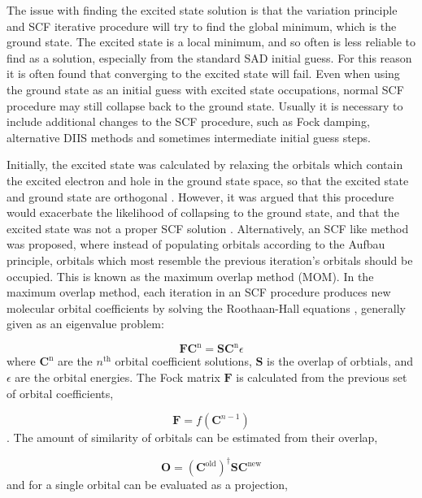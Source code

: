 The issue with finding the excited state solution is that the variation principle
and SCF iterative procedure will try to find the global minimum, which is the 
ground state. The excited state is a local minimum, and so often is less reliable
to find as a solution, especially from the standard SAD initial guess.
For this reason it is often found that converging to the \dscf excited state will
fail. Even when using the ground state as an initial guess with excited state
occupations, normal SCF procedure may still collapse back to the ground state.
Usually it is necessary to include additional changes to the SCF procedure,
such as Fock damping, alternative DIIS methods and sometimes intermediate 
initial guess steps.

Initially, the excited state was calculated by relaxing the orbitals which
contain the excited electron and hole in the ground state space, so that the
excited state and ground state are orthogonal \cite{Hunt1969}. However, it was
argued that this procedure would exacerbate the likelihood of collapsing to the ground
state, and that the excited state was not a proper SCF solution \cite{Gilbert2008}.
Alternatively, an SCF like method was proposed, where instead of
populating orbitals according to the Aufbau principle, orbitals which most
resemble the previous iteration's orbitals should be occupied. This is known as 
the maximum overlap method (MOM). In the maximum overlap method, each iteration 
in an SCF procedure produces new molecular orbital coefficients by solving the 
Roothaan-Hall equations \cite{Roothaan1951}, generally given as an eigenvalue problem:

\begin{equation}
\mathbf{F} \mathbf{C}^{\text{n}} = \mathbf{S} \mathbf{C}^{\text{n}} \epsilon
\label{eq:roothaan_hall}
\end{equation}
%
where $\mathbf{C}^{\text{n}}$ are the $n^{\text{th}}$ orbital coefficient solutions, 
$\mathbf{S}$ is the overlap of orbtials, and $\epsilon$ are the orbital energies. 
The Fock matrix $\mathbf{F}$ is calculated from the previous set of orbital 
coefficients,

\begin{equation}
\mathbf{F} = f\left(\mathbf{C}^{n-1}\right)
\end{equation}
%
. The amount of similarity of orbitals can be estimated from their overlap,

\begin{equation}
\mathbf{O} = \left(\mathbf{C}^{\text{old}}\right)^\dagger \mathbf{S} \mathbf{C}^{\text{new}}
\end{equation}
%
and for a single orbital can be evaluated as a projection,

